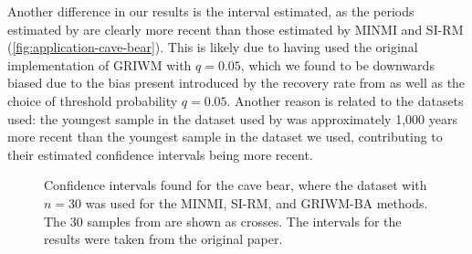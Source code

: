 Another difference in our results is the interval estimated, as the periods estimated by \citet{Baca2016} are clearly more recent than those estimated by MINMI and SI-RM (\autoref{fig:application-cave-bear}). This is likely due to \citet{Baca2016} having used the original implementation of GRIWM with $q = 0.05$, which we found to be downwards biased due to the bias present introduced by the recovery rate from \citet{Mcinerny2006} as well as the choice of threshold probability $q=0.05$. Another reason is related to the datasets used: the youngest sample in the dataset used by \citet{Baca2016} was approximately 1{\small,}000 years more recent than the youngest sample in the dataset we used, contributing to their estimated confidence intervals being more recent.
\begin{figure}[ht]
    \centering
    
    \caption{Confidence intervals found for the cave bear, where the \citet{Cooper2015} dataset with $n=30$ was used for the MINMI, SI-RM, and GRIWM-BA methods. The 30 samples from \citet{Cooper2015} are shown as crosses. The intervals for the \citet{Baca2016} results were taken from the original paper.}
    \label{fig:application-cave-bear}
\end{figure}